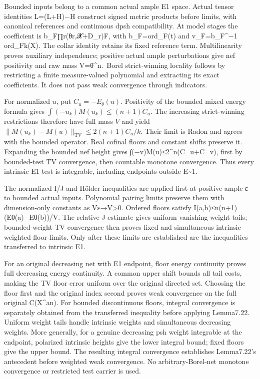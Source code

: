 \documentclass[
  10pt,
]{article}
\begin{document}
Bounded inputs belong to a common actual ample E1 space. Actual tensor
identities L=(L+H)−H construct signed metric products before limits,
with canonical references and continuous dpsh compatibility. At model
stages the coefficient is b\_F∏r(θr,𝓧+D\_r)\textbar F, with
b\_F=ord\_F(t) and v\_F=b\_F\^{}−1 ord\_F\textbar k(X). The collar
identity retains its fixed reference term. Multilinearity proves
auxiliary independence; positive actual ample perturbations give nef
positivity and raw mass V=θ\^{}n.~Borel strict-winning locality follows
by restricting a finite measure-valued polynomial and extracting its
exact coefficients. It does not pass weak convergence through
indicators.

For normalized \(u\), put \(C_u=-E_\theta(u)\). Positivity of the bounded mixed energy
formula gives \(\int(-u_k)M(u_k)\leq(n+1)C_u\). The increasing strict-winning
restrictions therefore have full mass \(V\) and yield
\(\|M(u_k)-M(u)\|_{\mathrm{TV}}\leq2(n+1)C_u/k\). Their
limit is Radon and agrees with the bounded operator. Real cofinal floors
and constant shifts preserve it. Expanding the bounded nef height gives
∫(−v)M(u)≤2\^{}n(C\_u+C\_v), first by bounded-test TV convergence, then
countable monotone convergence. Thus every intrinsic E1 test is
integrable, including endpoints outside E\textasciitilde1.

The normalized I/J and Hölder inequalities are applied first at positive
ample ε to bounded actual inputs. Polynomial pairing limits preserve
them with dimension-only constants as Vε→V\textgreater0. Ordered floors
satisfy I(a,b)≤n(n+1)(Eθ(a)−Eθ(b))/V. The relative-J estimate gives
uniform vanishing weight tails; bounded-weight TV convergence then
proves fixed and simultaneous intrinsic weighted floor limits. Only
after these limits are established are the inequalities transferred to
intrinsic E1.

For an original decreasing net with E1 endpoint, floor energy continuity
proves full decreasing energy continuity. A common upper shift bounds
all tail costs, making the TV floor error uniform over the original
directed set. Choosing the floor first and the original index second
proves weak convergence on the full original C(X\^{}an). For bounded
discontinuous floors, integral convergence is separately obtained from
the transferred inequality before applying Lemma7.22. Uniform weight
tails handle intrinsic weights and simultaneous decreasing weights. More
generally, for a genuine decreasing psh weight integrable at the
endpoint, polarized intrinsic heights give the lower integral bound;
fixed floors give the upper bound. The resulting integral convergence
establishes Lemma7.22's antecedent before weighted weak convergence. No
arbitrary-Borel-net monotone convergence or restricted test carrier is
used.
\end{document}
